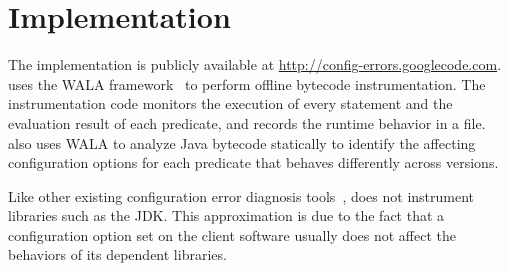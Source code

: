 \section{Implementation}
\label{sec:implementation}

The \ourtool implementation is publicly available at
\url{http://config-errors.googlecode.com}.
\ourtool uses the WALA framework~\cite{wala} to perform offline
bytecode instrumentation. The instrumentation code
monitors the execution of every statement and the evaluation
result of each predicate, and records the runtime behavior
in a file. \ourtool also uses WALA
to analyze Java bytecode statically to
identify the affecting configuration options
for each predicate that behaves differently across versions.

Like other existing configuration error
diagnosis tools~\cite{Rabkin:2011:PPC, Zhang:2013:ADS}, \ourtool
does not instrument libraries such as the JDK.
This approximation is due to the fact that a configuration
option set on the client software usually
does not affect the behaviors of its dependent libraries.

